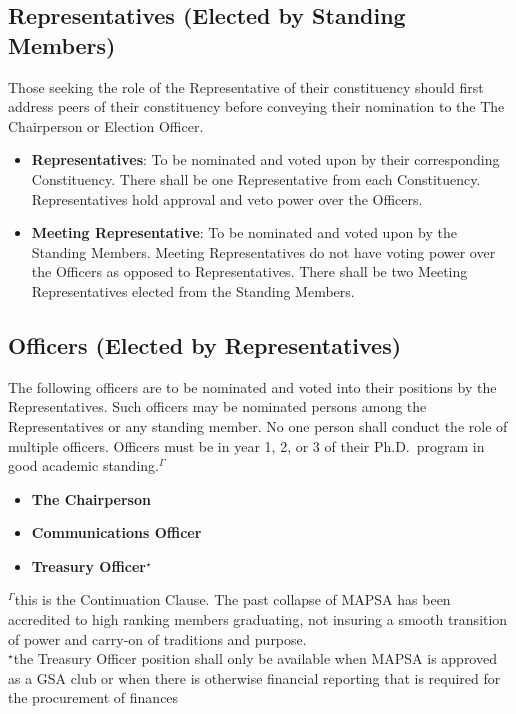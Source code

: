 \documentclass[8pt]{article}
\begin{document}
	\subsection{Representatives (Elected by Standing Members)}\label{subsec:rep}
	Those seeking the role of the Representative of their constituency should first address peers of their constituency before conveying their nomination to the The Chairperson or Election Officer. 
	\begin{itemize}
		\item \textbf{Representatives}: To be nominated and voted upon by their corresponding Constituency. There shall be one Representative from each Constituency. Representatives hold approval and veto power over the Officers.
		\item \textbf{Meeting Representative}: To be nominated and voted upon by the Standing Members. Meeting Representatives do not have voting power over the Officers as opposed to Representatives. There shall be two Meeting Representatives elected from the Standing Members.
	\end{itemize}
	\subsection{Officers (Elected by Representatives)}\label{subsec:off}
	The following officers are to be nominated and voted into their positions by the Representatives. Such officers may be nominated persons among the Representatives or any standing member. No one person shall conduct the role of multiple officers. Officers must be in year 1, 2, or 3 of their Ph.D.~program in good academic standing.$^\Gamma$
	\begin{itemize}
		\item \textbf{The Chairperson}
		\item \textbf{Communications Officer}
		\item \textbf{Treasury Officer$^\star$}
	\end{itemize}
	$^\Gamma$this is the Continuation Clause. The past collapse of MAPSA has been accredited to high ranking members graduating, not insuring a smooth transition of power and carry-on of traditions and purpose.\\
	$^\star$the Treasury Officer position shall only be available when MAPSA is approved as a GSA club or when there is otherwise financial reporting that is required for the procurement of finances\\
\end{document}
